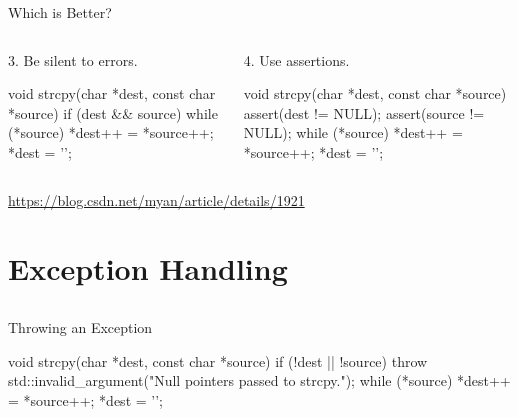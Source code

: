 \documentclass{beamer}
\begin{document}
\begin{frame}[fragile]{Which is Better?}
  \begin{columns}
    \begin{column}{0.5\textwidth}
      3. Be silent to errors.
      \begin{cpp}
void strcpy(char *dest,
    const char *source) {
  if (dest && source) {
    while (*source)
      *dest++ = *source++;
    *dest = '\0';
  }
}
      \end{cpp}
    \end{column}
    \begin{column}{0.5\textwidth}
      4. Use assertions.
      \begin{cpp}
void strcpy(char *dest,
    const char *source) {
  assert(dest != NULL);
  assert(source != NULL);
  while (*source)
    *dest++ = *source++;
  *dest = '\0';
}
      \end{cpp}
    \end{column}
  \end{columns}
  \url{https://blog.csdn.net/myan/article/details/1921}
\end{frame}

\section{Exception Handling}

\subsection{}

\begin{frame}[fragile]{Throwing an Exception}
  \begin{cpp}
void strcpy(char *dest, const char *source) {
  if (!dest || !source)
    throw std::invalid_argument("Null pointers passed to strcpy.");
  while (*source)
    *dest++ = *source++;
  *dest = '\0';
}
  \end{cpp}
\end{frame}
\end{document}
